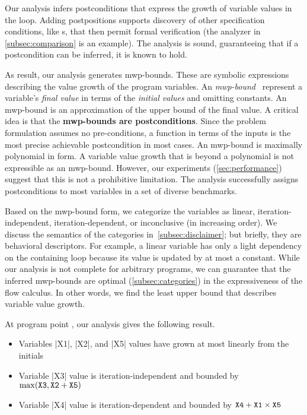 Our analysis infers postconditions that express the {growth of variable values} in the loop.
Adding postpositions supports discovery of other specification conditions, like s,
that then permit formal verification (the  analyzer in \autoref{subsec:comparison} is an example).
The analysis is sound, guaranteeing that if a postcondition can be inferred, it is known to hold.

As result, our analysis generates {mwp-bounds}.
These are symbolic expressions describing the value growth of the program variables.
An \emph{mwp-bound}~\cite{jones2009} represent a variable's \emph{final value} in terms of the \emph{initial values} and omitting constants.
An mwp-bound is an approximation of the {upper bound} of the final value.
A critical idea is that the \textbf{mwp-bounds are postconditions}.
Since the problem formulation assumes no pre-conditions, a function in terms of the inputs is the most precise achievable postcondition in most cases.
An mwp-bound is maximally polynomial in form.
A variable value growth that is beyond a polynomial is not expressible as an mwp-bound.
However, our experiments (\autoref{sec:performance}) suggest that this is not a prohibitive limitation.
The analysis successfully assigns postconditions to most variables in a set of diverse benchmarks.

Based on the mwp-bound form, we categorize the variables as linear, iteration-independent, iteration-dependent, or inconclusive (in increasing order).
We discuss the semantics of the categories in~\autoref{subsec:disclaimer};
but briefly, they are behavioral descriptors.
For example, a linear variable has only a light dependency on the containing loop because its value is updated by at most a constant.
While our analysis is not complete for arbitrary programs, we can guarantee that the inferred mwp-bounds are {optimal} (\autoref{subsec:categories}) \wrt in the expressiveness of the flow calculus.
In other words, we find the least upper bound that describes variable value growth.

At program point \qtext, our analysis gives the following result.
\begin{itemize}
\item Variables \pr|X1|, \pr|X2|, and \pr|X5| values have grown at most linearly from the initials
\item Variable  \pr|X3| value is iteration-independent and bounded by \(\max(\prm{X3},\prm{X2}+\prm{X5})\)
\item Variable  \pr|X4| value is iteration-dependent and bounded by \(\prm{X4}+\prm{X1}\times\prm{X5}\)
\end{itemize}

